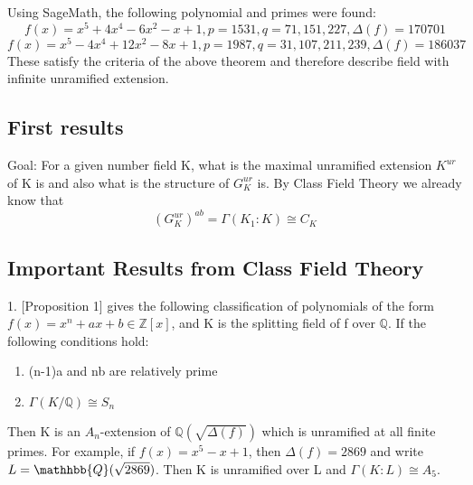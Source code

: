 \documentclass[preprint,12pt,reqno]{elsarticle}
\begin{document}
Using SageMath, the following polynomial and primes were found:
\begin{equation}
    f(x)=x^5+4x^4-6x^2-x+1, p=1531,q=71,151,227,\Delta(f)=170701
\end{equation}
\begin{equation}
 f(x)=x^5-4x^4+12x^2-8x+1,p=1987,q=31,107,211,239,\Delta(f)=186037
 \end{equation}
These satisfy the criteria of the above theorem and therefore describe field with infinite unramified extension. 
\subsection{First results}
Goal: For a given number field K, what is the maximal unramified extension $K^{ur}$ of K is and also what is the structure of $G_K^{ur}$ is. By Class Field Theory we already know that 
\begin{equation}
  (G_K^{ur})^{ab} = \Gamma(K_1:K)\cong C_K
\end{equation}

\subsection{Important Results from Class Field Theory}
1. \cite{YAMA}[Proposition 1] gives the following classification of polynomials of the form $f(x) = x^n+ax+b \in \mathbb{Z}[x]$, and K is the splitting field of f over $\mathbb{Q}$.
\newline
If the following conditions hold:
\begin{enumerate}
    \item (n-1)a and nb are relatively prime 
    \item $\Gamma(K/\mathbb{Q}) \cong S_n$
\end{enumerate}
\newline
Then K is an $A_n$-extension of $\mathbb{Q}(\sqrt{\Delta(f)})$ which is unramified at all finite primes. For example, if $f(x) = x^5-x+1$, then $\Delta(f)= 2869$ and write $L = \mathhbb{Q}(\sqrt{2869})$. Then K is unramified over L and $\Gamma(K:L)\cong A_5.$
\end{document}
